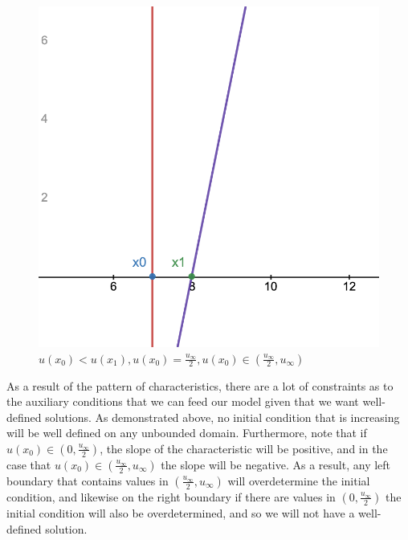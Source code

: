 \documentclass[12pt]{article}
\begin{document}
\begin{figure}[!htb]
        \caption{$u(x_0) > u(x_1), u(x_0), u(x_1) \in (\frac{u_\infty}{2}, u_\infty)$}\label{fig:no_shock_x1_x2_gt_half}
        \endminipage\hfill
        \includegraphics[width=\linewidth]{figures/no_shock_x0_eq_half.png}
        \caption{$u(x_0) < u(x_1), u(x_0) = \frac{u_\infty}{2},  u(x_0) \in (\frac{u_\infty}{2}, u_\infty) $}\label{fig:no_shock_x0_eq_half}
        \endminipage
    \end{figure}
    
    As a result of the pattern of characteristics, there are a lot of constraints as to the auxiliary conditions that we can feed our model given that we want well-defined solutions. As demonstrated above, no initial condition that is increasing will be well defined on any unbounded domain. Furthermore, note that if $u(x_0) \in (0, \frac{u_\infty}{2} )$, the slope of the characteristic will be positive, and in the case that $u(x_0) \in ( \frac{u_\infty}{2}, u_\infty )$ the slope will be negative. As a result, any left boundary that contains values in $( \frac{u_\infty}{2}, u_\infty )$ will overdetermine the initial condition, and likewise on the right boundary if there are values in $(0, \frac{u_\infty}{2} )$ the initial condition will also be overdetermined, and so we will not have a well-defined solution. 
    
\end{document}
